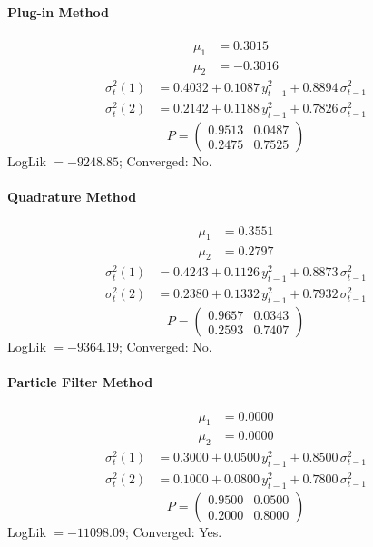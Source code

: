 \documentclass[11pt, a4paper]{article}
\begin{document}
\paragraph{Plug-in Method}
\begin{align}
\mu_{1} &= 0.3015 \\
\mu_{2} &= -0.3016
\end{align}
\begin{align}
\sigma^2_{t}(1) &= 0.4032 + 0.1087\, y_{t-1}^2 + 0.8894\, \sigma^2_{t-1} \\
\sigma^2_{t}(2) &= 0.2142 + 0.1188\, y_{t-1}^2 + 0.7826\, \sigma^2_{t-1}
\end{align}
\begin{equation}
P = \begin{pmatrix} 0.9513 & 0.0487 \\ 0.2475 & 0.7525 \end{pmatrix}
\end{equation}
LogLik $= -9248.85$; Converged: No.

\paragraph{Quadrature Method}
\begin{align}
\mu_{1} &= 0.3551 \\
\mu_{2} &= 0.2797
\end{align}
\begin{align}
\sigma^2_{t}(1) &= 0.4243 + 0.1126\, y_{t-1}^2 + 0.8873\, \sigma^2_{t-1} \\
\sigma^2_{t}(2) &= 0.2380 + 0.1332\, y_{t-1}^2 + 0.7932\, \sigma^2_{t-1}
\end{align}
\begin{equation}
P = \begin{pmatrix} 0.9657 & 0.0343 \\ 0.2593 & 0.7407 \end{pmatrix}
\end{equation}
LogLik $= -9364.19$; Converged: No.

\paragraph{Particle Filter Method}
\begin{align}
\mu_{1} &= 0.0000 \\
\mu_{2} &= 0.0000
\end{align}
\begin{align}
\sigma^2_{t}(1) &= 0.3000 + 0.0500\, y_{t-1}^2 + 0.8500\, \sigma^2_{t-1} \\
\sigma^2_{t}(2) &= 0.1000 + 0.0800\, y_{t-1}^2 + 0.7800\, \sigma^2_{t-1}
\end{align}
\begin{equation}
P = \begin{pmatrix} 0.9500 & 0.0500 \\ 0.2000 & 0.8000 \end{pmatrix}
\end{equation}
LogLik $= -11098.09$; Converged: Yes.
\end{document}
